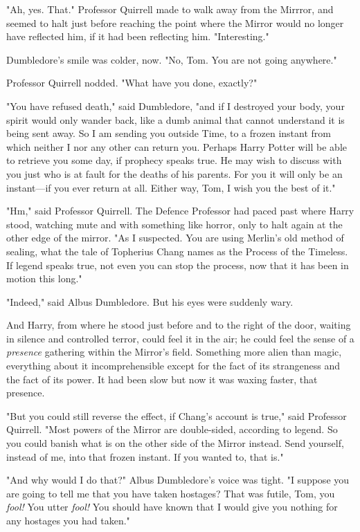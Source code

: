"Ah, yes. That." Professor Quirrell made to walk away from the Mirrror, and
seemed to halt just before reaching the point where the Mirror would no longer
have reflected him, if it had been reflecting him. "Interesting."

Dumbledore's smile was colder, now. "No, Tom. You are not going anywhere."

Professor Quirrell nodded. "What have you done, exactly?"

"You have refused death," said Dumbledore, "and if I destroyed your body, your
spirit would only wander back, like a dumb animal that cannot understand it is
being sent away. So I am sending you outside Time, to a frozen instant from
which neither I nor any other can return you. Perhaps Harry Potter will be able
to retrieve you some day, if prophecy speaks true. He may wish to discuss with
you just who is at fault for the deaths of his parents. For you it will only be
an instant---if you ever return at all. Either way, Tom, I wish you the best of
it."

"Hm," said Professor Quirrell. The Defence Professor had paced past where Harry
stood, watching mute and with something like horror, only to halt again at the
other edge of the mirror. "As I suspected. You are using Merlin's old method of
sealing, what the tale of Topherius Chang names as the Process of the Timeless.
If legend speaks true, not even you can stop the process, now that it has been
in motion this long."

"Indeed," said Albus Dumbledore. But his eyes were suddenly wary.

And Harry, from where he stood just before and to the right of the door,
waiting in silence and controlled terror, could feel it in the air; he could
feel the sense of a \emph{presence} gathering within the Mirror's field.
Something more alien than magic, everything about it incomprehensible except
for the fact of its strangeness and the fact of its power. It had been slow but
now it was waxing faster, that presence.

"But you could still reverse the effect, if Chang's account is true," said
Professor Quirrell. "Most powers of the Mirror are double-sided, according to
legend. So you could banish what is on the other side of the Mirror instead.
Send yourself, instead of me, into that frozen instant. If you wanted to, that
is."

"And why would I do that?" Albus Dumbledore's voice was tight. "I suppose you
are going to tell me that you have taken hostages? That was futile, Tom, you
\emph{fool!} You utter \emph{fool!} You should have known that I would give you
nothing for any hostages you had taken."

